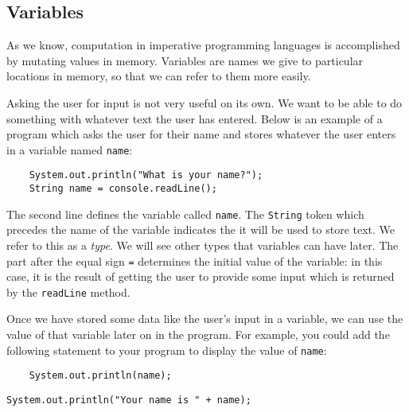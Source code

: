 \subsection*{Variables}

As we know, computation in imperative programming languages is accomplished by mutating values in memory. Variables are names we give to particular locations in memory, so that we can refer to them more easily. 

Asking the user for input is not very useful on its own. We want to be able to do something with whatever text the user has entered. Below is an example of a program which asks the user for their name and stores whatever the user enters in a variable named \texttt{name}: 
\begin{verbatim}
    System.out.println("What is your name?");
    String name = console.readLine();
\end{verbatim}
The second line defines the variable called \texttt{name}. The \texttt{String} token which precedes the name of the variable indicates the it will be used to store text. We refer to this as a \emph{type}. We will see other types that variables can have later. The part after the equal sign \texttt{=} determines the initial value of the variable: in this case, it is the result of getting the user to provide some input which is returned by the \texttt{readLine} method.

Once we have stored some data like the user's input in a variable, we can use the value of that variable later on in the program. For example, you could add the following statement to your program to display the value of \texttt{name}:
\begin{verbatim}
    System.out.println(name);
\end{verbatim}
\taskLine 
{}
\taskLine 

\begin{verbatim}
System.out.println("Your name is " + name);
\end{verbatim}
\taskLine 
{}
\taskLine 


